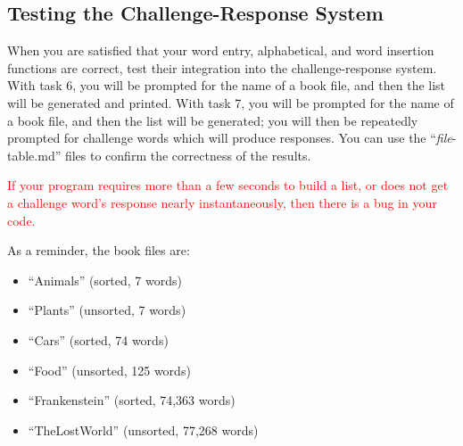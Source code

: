 \begin{description}
\end{description}


\subsection{Testing the Challenge-Response System} \label{subsec:TestingChallengeResponse}

When you are satisfied that your word entry, alphabetical, and word insertion functions are correct, test their integration into the challenge-response system.
With task 6, you will be prompted for the name of a book file, and then the list will be generated and printed.
With task 7, you will be prompted for the name of a book file, and then the list will be generated; you will then be repeatedly prompted for challenge words which will produce responses.
You can use the ``\textit{file}-table.md'' files to confirm the correctness of the results.

\textcolor{red}{If your program requires more than a few seconds to build a list, or does not get a challenge word's response nearly instantaneously, then there is a bug in your code.}

\begin{description}
\end{description}

As a reminder, the book files are:

\begin{itemize}
    \item ``Animals'' (sorted, 7 words)
    \item ``Plants'' (unsorted, 7 words)
    \item ``Cars'' (sorted, 74 words)
    \item ``Food'' (unsorted, 125 words)
    \item ``Frankenstein'' (sorted, 74,363 words)
    \item ``TheLostWorld'' (unsorted, 77,268 words)
\end{itemize}



